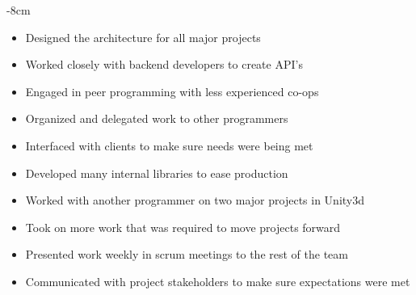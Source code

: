 \documentclass[10pt,a4paper]{altacv}
\begin{document}

\begin{adjustwidth}{}{-8cm}
\makecvheader
\end{adjustwidth}


\begin{itemize}
	\item Designed the architecture for all major projects
	\item Worked closely with backend developers to create API's
	\item Engaged in peer programming with less experienced co-ops
	\item Organized and delegated work to other programmers
	\item Interfaced with clients to make sure needs were being met
	\item Developed many internal libraries to ease production
\end{itemize}

\divider

\begin{itemize}
	\item Worked with another programmer on two major projects in Unity3d
	\item Took on more work that was required to move projects forward
	\item Presented work weekly in scrum meetings to the rest of the team
	\item Communicated with project stakeholders to make sure expectations were met
\end{itemize}
\end{document}
